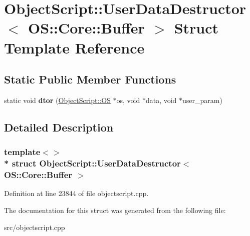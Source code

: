 \hypertarget{struct_object_script_1_1_user_data_destructor_3_01_o_s_1_1_core_1_1_buffer_01_4}{}\section{Object\+Script\+:\+:User\+Data\+Destructor$<$ OS\+:\+:Core\+:\+:Buffer $>$ Struct Template Reference}
\label{struct_object_script_1_1_user_data_destructor_3_01_o_s_1_1_core_1_1_buffer_01_4}
\subsection*{Static Public Member Functions}
\begin{DoxyCompactItemize}
\item 
static void {\bfseries dtor} (\hyperlink{class_object_script_1_1_o_s}{Object\+Script\+::\+OS} $\ast$os, void $\ast$data, void $\ast$user\+\_\+param)\hypertarget{struct_object_script_1_1_user_data_destructor_3_01_o_s_1_1_core_1_1_buffer_01_4_ac75a7d26c8c28416ff9a821538bd2b83}{}\label{struct_object_script_1_1_user_data_destructor_3_01_o_s_1_1_core_1_1_buffer_01_4_ac75a7d26c8c28416ff9a821538bd2b83}

\end{DoxyCompactItemize}


\subsection{Detailed Description}
\subsubsection*{template$<$$>$\\*
struct Object\+Script\+::\+User\+Data\+Destructor$<$ O\+S\+::\+Core\+::\+Buffer $>$}



Definition at line 23844 of file objectscript.\+cpp.



The documentation for this struct was generated from the following file\+:\begin{DoxyCompactItemize}
\item 
src/objectscript.\+cpp\end{DoxyCompactItemize}
